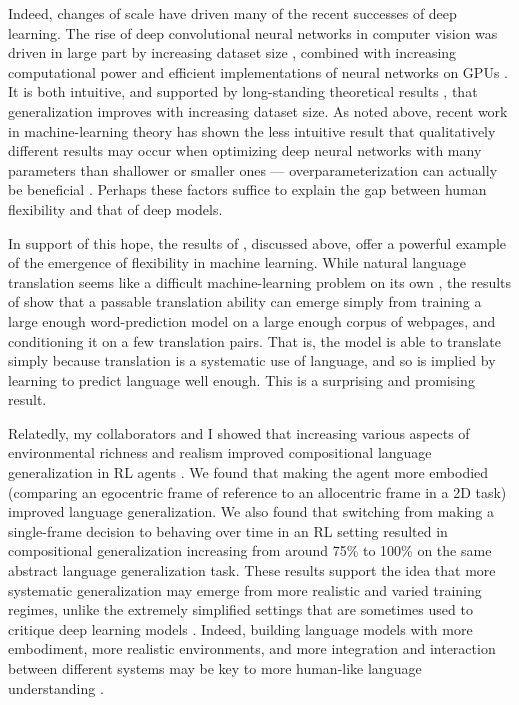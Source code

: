Indeed, changes of scale have driven many of the recent successes of deep learning. The rise of deep convolutional neural networks in computer vision was driven in large part by increasing dataset size \citep{Deng2009}, combined with increasing computational power and efficient implementations of neural networks on GPUs \citep{Krizhevsky2012}. It is both intuitive, and supported by long-standing theoretical results \citep{Bartlett2002}, that generalization improves with increasing dataset size. As noted above, recent work in machine-learning theory has shown the less intuitive result that qualitatively different results may occur when optimizing deep neural networks with many parameters than shallower or smaller ones --- overparameterization can actually be beneficial \citep{Dauphin2014, Arora2018a}. Perhaps these factors suffice to explain the gap between human flexibility and that of deep models.\par 
In support of this hope, the results of \citet{Radford2019}, discussed above, offer a powerful example of the emergence of flexibility in machine learning. While natural language translation seems like a difficult machine-learning problem on its own \citep{Wu2016}, the results of \citet{Radford2019} show that a passable translation ability can emerge simply from training a large enough word-prediction model on a large enough corpus of webpages, and conditioning it on a few translation pairs. That is, the model is able to translate simply because translation is a systematic use of language, and so is implied by learning to predict language well enough. This is a surprising and promising result. \par 
Relatedly, my collaborators and I showed that increasing various aspects of environmental richness and realism improved compositional language generalization in RL agents \citep{Hill2019a}. We found that making the agent more embodied (comparing an egocentric frame of reference to an allocentric frame in a 2D task) improved language generalization. We also found that switching from making a single-frame decision to behaving over time in an RL setting resulted in compositional generalization increasing from around 75\% to 100\% on the same abstract language generalization task. These results support the idea that more systematic generalization may emerge from more realistic and varied training regimes, unlike the extremely simplified settings that are sometimes used to critique deep learning models \citep[see e.g.][]{Lake2017}. Indeed, building language models with more embodiment, more realistic environments, and more integration and interaction between different systems may be key to more human-like language understanding \citep{McClelland2019}.\par
